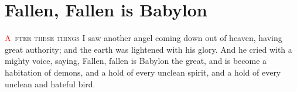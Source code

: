 
\chapter{Fallen, Fallen is Babylon}
\lettrine[lines=3,slope=0.5em]{\textcolor{red}{A}}{\ fter these things} I saw another angel coming down out of heaven, having great authority; and the earth was lightened with his glory.%
 And he cried with a mighty voice, saying, Fallen, fallen is Babylon the great,%
 and is become a habitation of demons, and a hold of every unclean spirit, and a hold of every unclean and hateful bird.%
